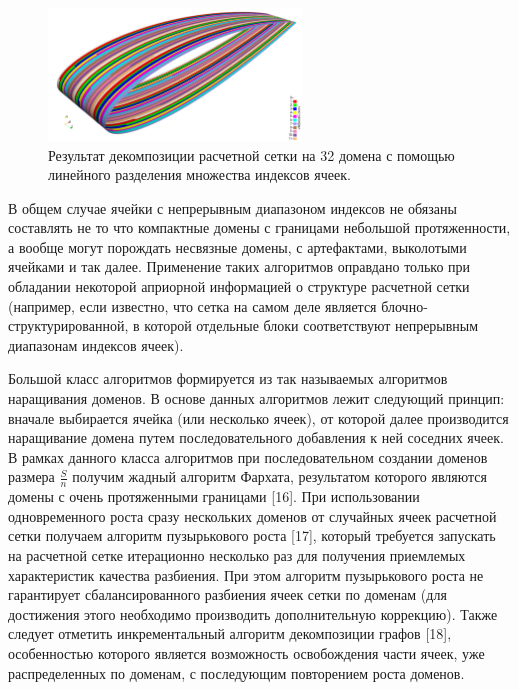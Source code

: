\begin{figure}[ht]
	\centering
		\includegraphics[width=0.6\textwidth]{./pics/text_2_decompsurf/wing_linear_32.png}
	\caption{Результат декомпозиции расчетной сетки на 32 домена с помощью линейного разделения множества индексов ячеек.}
	\label{fig:text_2_decompsurf_wing_linear_32}
\end{figure}

В общем случае ячейки с непрерывным диапазоном индексов не обязаны составлять не то что компактные домены с границами небольшой протяженности, а вообще могут порождать несвязные домены, с артефактами, выколотыми ячейками и так далее.
Применение таких алгоритмов оправдано только при обладании некоторой априорной информацией о структуре расчетной сетки (например, если известно, что сетка на самом деле является блочно-структурированной, в которой отдельные блоки соответствуют непрерывным диапазонам индексов ячеек).

Большой класс алгоритмов формируется из так называемых алгоритмов наращивания доменов.
В основе данных алгоритмов лежит следующий принцип: вначале выбирается ячейка (или несколько ячеек), от которой далее производится наращивание домена путем последовательного добавления к ней соседних ячеек.
В рамках данного класса алгоритмов при последовательном создании доменов размера $\frac{S}{n}$ получим жадный алгоритм Фархата, результатом которого являются домены с очень протяженными границами [16].
При использовании одновременного роста сразу нескольких доменов от случайных ячеек расчетной сетки получаем алгоритм пузырькового роста [17], который требуется запускать на расчетной сетке итерационно несколько раз для получения приемлемых характеристик качества разбиения.
При этом алгоритм пузырькового роста не гарантирует сбалансированного разбиения ячеек сетки по доменам (для достижения этого необходимо производить дополнительную коррекцию).
Также следует отметить инкрементальный алгоритм декомпозиции графов [18], особенностью которого является возможность освобождения части ячеек, уже распределенных по доменам, с последующим повторением роста доменов.

